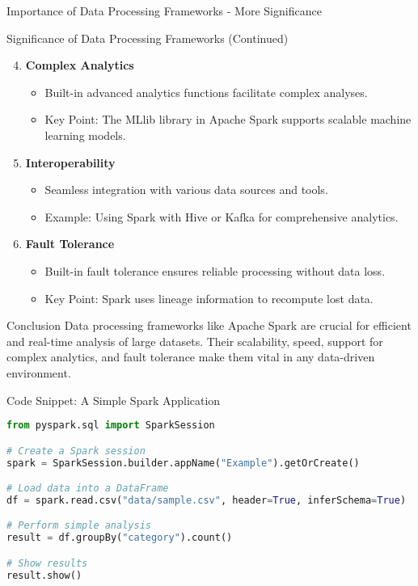 \documentclass[aspectratio=169]{beamer}
\begin{document}
\begin{frame}[fragile]{Importance of Data Processing Frameworks - More Significance}
    \begin{block}{Significance of Data Processing Frameworks (Continued)}
        \begin{enumerate}
            \setcounter{enumi}{3}
            \item \textbf{Complex Analytics}
            \begin{itemize}
                \item Built-in advanced analytics functions facilitate complex analyses.
                \item Key Point: The MLlib library in Apache Spark supports scalable machine learning models.
            \end{itemize}
            \item \textbf{Interoperability}
            \begin{itemize}
                \item Seamless integration with various data sources and tools.
                \item Example: Using Spark with Hive or Kafka for comprehensive analytics.
            \end{itemize}
            \item \textbf{Fault Tolerance}
            \begin{itemize}
                \item Built-in fault tolerance ensures reliable processing without data loss.
                \item Key Point: Spark uses lineage information to recompute lost data.
            \end{itemize}
        \end{enumerate}
    \end{block}
\end{frame}

\begin{frame}[fragile]{Conclusion}
    Data processing frameworks like Apache Spark are crucial for efficient and real-time analysis of large datasets. Their scalability, speed, support for complex analytics, and fault tolerance make them vital in any data-driven environment.
\end{frame}

\begin{frame}[fragile]{Code Snippet: A Simple Spark Application}
    \begin{lstlisting}[language=Python]
from pyspark.sql import SparkSession

# Create a Spark session
spark = SparkSession.builder.appName("Example").getOrCreate()

# Load data into a DataFrame
df = spark.read.csv("data/sample.csv", header=True, inferSchema=True)

# Perform simple analysis
result = df.groupBy("category").count()

# Show results
result.show()
    \end{lstlisting}
\end{frame}
\end{document}

